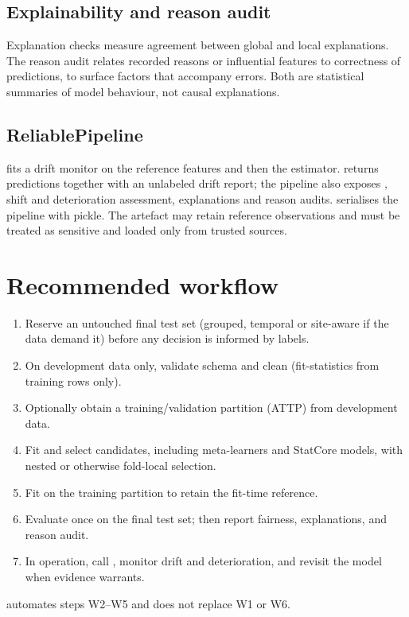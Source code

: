 \documentclass[conference]{IEEEtran}
\begin{document}
\subsection{Explainability and reason audit}
Explanation checks measure agreement between global and local explanations. The reason audit relates recorded reasons or influential features to correctness of predictions, to surface factors that accompany errors. Both are statistical summaries of model behaviour, not causal explanations.

\subsection{ReliablePipeline}
 fits a drift monitor on the reference features and then the estimator.  returns predictions together with an unlabeled drift report; the pipeline also exposes , shift and deterioration assessment, explanations and reason audits.  serialises the pipeline with pickle. The artefact may retain reference observations and must be treated as sensitive and loaded only from trusted sources.

\section{Recommended workflow}
\begin{enumerate}[label=\textbf{W\arabic*.},leftmargin=*]
\item Reserve an untouched final test set (grouped, temporal or site-aware if the data demand it) before any decision is informed by labels.
\item On development data only, validate schema and clean (fit-statistics from training rows only).
\item Optionally obtain a training/validation partition (ATTP) from development data.
\item Fit and select candidates, including meta-learners and StatCore models, with nested or otherwise fold-local selection.
\item Fit  on the training partition to retain the fit-time reference.
\item Evaluate once on the final test set; then report fairness, explanations, and reason audit.
\item In operation, call , monitor drift and deterioration, and revisit the model when evidence warrants.
\end{enumerate}
 automates steps W2--W5 and does not replace W1 or W6.
\end{document}
